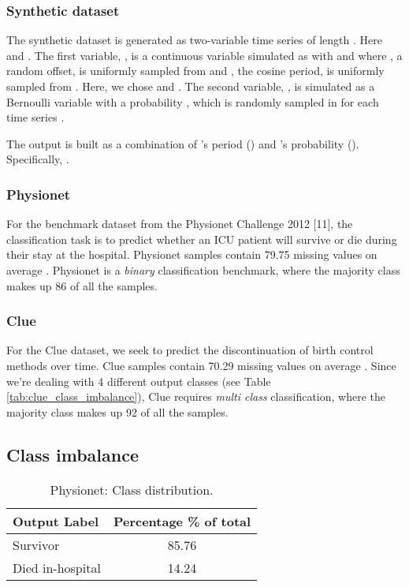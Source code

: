 \documentclass{article}
\begin{document}
\subsubsection*{Synthetic dataset}

The synthetic dataset is generated as  two-variable time series of length . Here  and . The first variable, , is a continuous variable simulated as  with  and where , a random offset, is uniformly sampled from  and , the cosine period, is uniformly sampled from . Here, we chose  and . The second variable, , is simulated as a Bernoulli variable with a probability , which is randomly sampled in  for each time series .

The output  is built as a combination of 's period () and 's probability (). Specifically, .


\subsubsection*{Physionet}
For the benchmark dataset from the Physionet Challenge 2012 [11], the classification task is to predict whether an ICU patient will survive or die during their stay at the hospital.
Physionet samples contain 79.75  missing values on average . Physionet is a \textit{binary} classification benchmark, where the majority class makes up 86 of all the samples.

\subsubsection*{Clue}
For the Clue dataset, we seek to predict the discontinuation of birth control methods over time.  
Clue samples contain 70.29  missing values on average .
Since we're dealing with 4 different output classes (see Table \ref{tab:clue_class_imbalance}), Clue requires \textit{multi class} classification, where the majority class makes up 92  of all the samples.


\subsection{\large Class imbalance}
\begin{table}[h]
\caption{\label{tab:physio_class_imbalance} Physionet: Class distribution.}
\vskip 0.15in
\begin{center}
\begin{sc}
\begin{tabular}{lc}
\toprule
Output Label & Percentage \% of total \\
\midrule
Survivor & 85.76 \\
Died in-hospital & 14.24 \\
\bottomrule
\end{tabular}
\end{sc}
\end{center}
\vskip -0.3in
\end{table}
\end{document}
